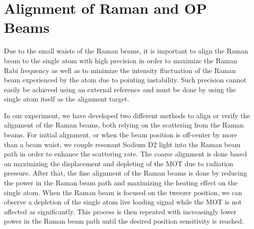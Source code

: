 \section{Alignment of Raman and OP Beams}
\label{ch:rsc:alignment}

Due to the small waists of the Raman beams, it is important to align the Raman beam to
the single atom with high precision in order to maximize the Raman Rabi frequency
as well as to minimize the intensity fluctuation of the Raman beam experienced by the atom
due to pointing instability.
Such precision cannot easily be achieved using an external reference and
must be done by using the single atom itself as the alignment target.

In our experiment, we have developed two different methods to align or verify the alignment
of the Raman beams, both relying on the scattering from the Raman beams.
For initial alignment, or when the beam position is off-center
by more than a beam waist, we couple resonant Sodium $\mathrm{D2}$ light into the Raman beam path
in order to enhance the scattering rate. The coarse alignment is done based on
maximizing the displacement and depleting of the MOT due to radiation pressure.
After that, the fine alignment of the Raman beams is done by reducing the power in the Raman
beam path and maximizing the heating effect on the single atom.
When the Raman beam is focused on the tweezer position,
we can observe a depletion of the single atom live loading signal
while the MOT is not affected as significantly.
This process is then repeated with increasingly lower power in the Raman beam path
until the desired position sensitivity is reached.

